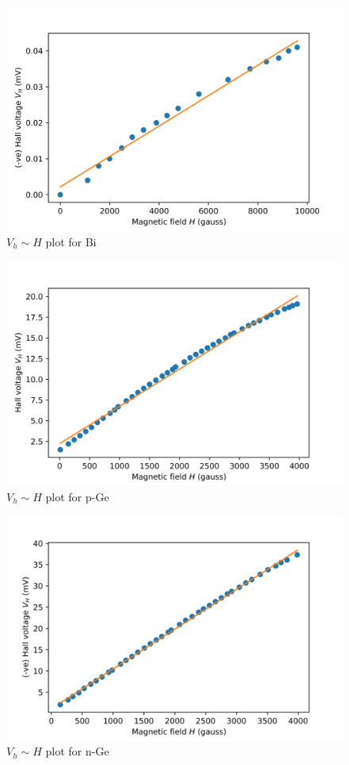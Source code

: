\documentclass[%
 aip,
 amsmath,amssymb,
 reprint,%
]{revtex4-1}
\begin{document}
\begin{figure}
    \centering
    \includegraphics[scale = 0.56]{Figures/plot-hall-Bi.png}
    \caption{$V_h \sim H$ plot for Bi}
    \label{fig:hallbiplot}
\end{figure}
\begin{figure}
    \centering
    \includegraphics[scale = 0.56]{Figures/plot-hall-p-Ge.png}
    \caption{$V_h \sim H$ plot for p-Ge}
    \label{fig:hallpGeplot}
\end{figure}
\begin{figure}
    \centering
    \includegraphics[scale = 0.56]{Figures/plot-hall-n-Ge.png}
    \caption{$V_h \sim H$ plot for n-Ge}
    \label{fig:hallnGeplot}
\end{figure}
\end{document}
